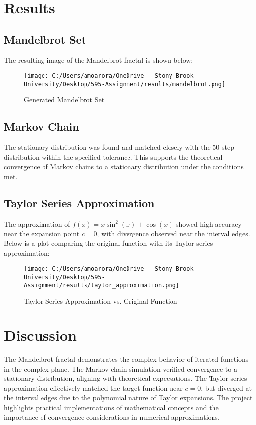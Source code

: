 \documentclass{article}
\begin{document}
\section{Results}

\subsection{Mandelbrot Set}
The resulting image of the Mandelbrot fractal is shown below:
\begin{figure}[H]
    \centering
    \texttt{[image: C:/Users/amoarora/OneDrive - Stony Brook University/Desktop/595-Assignment/results/mandelbrot.png]}
    \caption{Generated Mandelbrot Set}
\end{figure}

\subsection{Markov Chain}
The stationary distribution was found and matched closely with the 50-step distribution within the specified tolerance. This supports the theoretical convergence of Markov chains to a stationary distribution under the conditions met.

\subsection{Taylor Series Approximation}
The approximation of \( f(x) = x \sin^2(x) + \cos(x) \) showed high accuracy near the expansion point \( c = 0 \), with divergence observed near the interval edges. Below is a plot comparing the original function with its Taylor series approximation:
\begin{figure}[H]
    \centering
    \texttt{[image: C:/Users/amoarora/OneDrive - Stony Brook University/Desktop/595-Assignment/results/taylor\_approximation.png]}
    \caption{Taylor Series Approximation vs. Original Function}
\end{figure}

\section{Discussion}
The Mandelbrot fractal demonstrates the complex behavior of iterated functions in the complex plane. The Markov chain simulation verified convergence to a stationary distribution, aligning with theoretical expectations. The Taylor series approximation effectively matched the target function near \( c = 0 \), but diverged at the interval edges due to the polynomial nature of Taylor expansions. The project highlights practical implementations of mathematical concepts and the importance of convergence considerations in numerical approximations.
\end{document}
